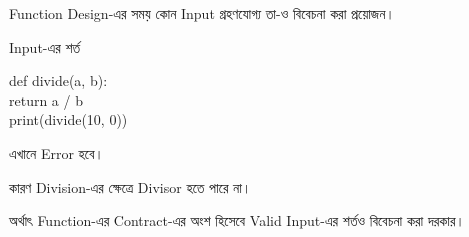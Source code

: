 

Function Design-এর সময় কোন Input গ্রহণযোগ্য তা-ও বিবেচনা করা প্রয়োজন।

\begin{codeoutputbox}{Input-এর শর্ত}

\noindent
\begin{minipage}[t]{0.52\linewidth}
\codeheading

\begin{english}
\ttfamily
def divide(a, b):\\
\hspace*{4mm}return a / b\\[0.5mm]
print(divide(10, 0))
\end{english}

\end{minipage}
\hfill
\begin{minipage}[t]{0.44\linewidth}
\outputheading

এখানে Error হবে।

কারণ Division-এর ক্ষেত্রে Divisor
\textenglish{}
হতে পারে না।

\medskip

অর্থাৎ Function-এর Contract-এর অংশ হিসেবে
Valid Input-এর শর্তও বিবেচনা করা দরকার।

\end{minipage}

\end{codeoutputbox}


